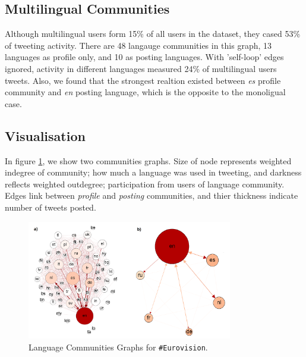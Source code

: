 \documentclass{llncs}
\begin{document}

\subsection{Multilingual Communities}
Although multilingual users form 15\% of all users in the dataset,
they cased 53\% of tweeting activity. There are 48 langauge communities
in this graph, 13 languages as profile only, and 10 as posting 
languages. With 'self-loop' edges ignored, activity in different languages 
measured 24\% of multilingual users tweets. Also, we found that the strongest 
realtion existed between \emph{es} profile community and \emph{en} 
posting language, which is the opposite to the monoligual case.


\subsection{Visualisation}

In figure \ref{fig:communitiesgraphs}, we show two communities graphs. 
Size of node represents weighted indegree of community; how much a language 
was used in tweeting, and darkness reflects weighted outdegree; participation 
from users of language community. Edges link between \emph{profile} and 
\emph{posting} communities, and thier thickness indicate number of tweets posted.

\begin{figure}[htb]
\centering
\includegraphics[width=0.8\textwidth]{images/communitiesgraphs.png}
\caption{Language Communities Graphs for {\texttt{\#Eurovision}}.}
\label{fig:communitiesgraphs}
\end{figure}
\end{document}
